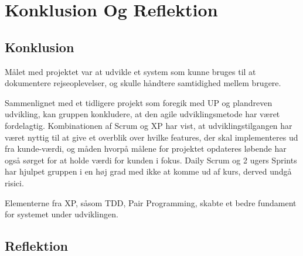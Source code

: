 \chapter{Konklusion Og Reflektion}\label{ch:KonklusionReflektion}

\section{Konklusion}
Målet med projektet var at udvikle et system som kunne bruges til at dokumentere rejseoplevelser, og skulle håndtere samtidighed mellem brugere. 

Sammenlignet med et tidligere projekt som foregik med UP og plandreven udvikling, kan gruppen konkludere, at den agile udviklingsmetode har været fordelagtig. Kombinationen af Scrum og XP har vist, at udviklingstilgangen har været nyttig til at give et overblik over hvilke features, der skal implementeres ud fra kunde-værdi, og måden hvorpå målene for projektet opdateres løbende har også sørget for at holde værdi for kunden i fokus. Daily Scrum og 2 ugers Sprints har hjulpet gruppen i en høj grad med ikke at komme ud af kurs, derved undgå risici. 

Elementerne fra XP, såsom TDD, Pair Programming, skabte et bedre fundament for systemet under udviklingen.



\section{Reflektion}